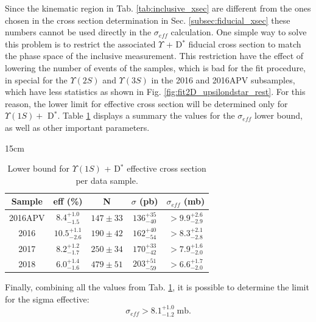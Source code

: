 Since the kinematic region in Tab. \ref{tab:inclusive_xsec} are different from the ones chosen in the cross section determination in Sec. \ref{subsec:fiducial_xsec} these numbers cannot be used directly in the $\sigma_{eff}$ calculation. One simple way to solve this problem is to restrict the associated $\Upsilon$ + D$^*$ fiducial cross section to match the phase space of the inclusive measurement. This restriction have the effect of lowering the number of events of the samples, which is bad for the fit procedure, in special for the $\Upsilon(2S)$ and $\Upsilon(3S)$ in the 2016 and 2016APV subsamples, which have less statistics as shown in Fig. \ref{fig:fit2D_upsilondstar_rest}. For this reason, the lower limit for effective cross section will be determined only for $\Upsilon(1S) +$ D$^*$. Table \ref{tab:xsec_eff} displays a summary the values for the $\sigma_{eff}$ lower bound, as well as other important parameters.

\begin{table}[!htbp]{15cm}
  \caption{Lower bound for $\Upsilon(1S)$ + D$^{*}$ effective cross section per data sample.}
  \begin{tabular}{ c | c | c | c | c }
    \hline
    Sample & eff (\%) & N & $\sigma$ (pb) & $\sigma_{eff}$ (mb) \\ \hline
    2016APV & $8.4^{+1.0}_{-1.5}$ & $147 \pm 33$ & $136^{+35}_{-40}$ & $>9.9^{+2.6}_{-2.9}$ \\ \hline 
    2016    & $10.5^{+1.1}_{-2.6}$ & $190 \pm 42$ & $162^{+40}_{-54}$ & $>8.3^{+2.1}_{-2.8}$ \\ \hline 
    2017    & $8.2^{+1.2}_{-1.7}$ & $250 \pm 34$ & $170^{+33}_{-42}$ & $>7.9^{+1.6}_{-2.0}$ \\ \hline 
    2018    & $6.0^{+1.4}_{-1.6}$ & $479 \pm 51$ & $203^{+51}_{-59}$ & $>6.6^{+1.7}_{-2.0}$ \\ \hline
  \end{tabular}
  \label{tab:xsec_eff}
\end{table}

Finally, combining all the values from Tab. \ref{tab:xsec_eff}, it is possible to determine the limit for the sigma effective:
\begin{equation}
  \sigma_{eff} > 8.1^{+1.0}_{-1.2} \; \text{mb}.
\end{equation}

